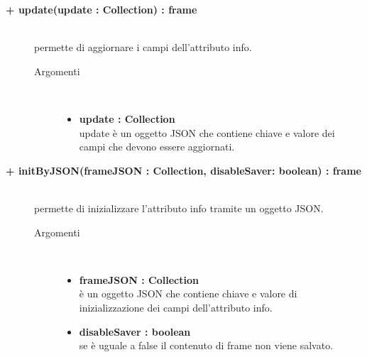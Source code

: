 \begin{description}
\begin{description}
\end{description}

\begin{description}
		\item[\textbf{+ update(update : Collection) : frame			}] \hfill \\
			permette di aggiornare i campi dell'attributo info.
			
		\begin{description}
			\item[Argomenti] \hfill \\
				\begin{itemize}
				
					\item \textbf{update : Collection			} \hfill \\
					update è un oggetto JSON che contiene chiave e valore dei campi che devono essere aggiornati. 
				\end{itemize}
		\end{description}

\end{description}

\begin{description}
		\item[\textbf{+ initByJSON(frameJSON : Collection, disableSaver: boolean) : frame			}] \hfill \\
			permette di inizializzare l'attributo info tramite un oggetto JSON. 
			
		\begin{description}
			\item[Argomenti] \hfill \\
				\begin{itemize}
				
					\item \textbf{frameJSON : Collection			} \hfill \\
					è un oggetto JSON che contiene chiave e valore di inizializzazione dei campi dell'attributo info. 
					\item \textbf{disableSaver : boolean			} \hfill \\
					se è uguale a false il contenuto di frame non viene salvato. %
				\end{itemize}
		\end{description}

\end{description}


\end{description}

